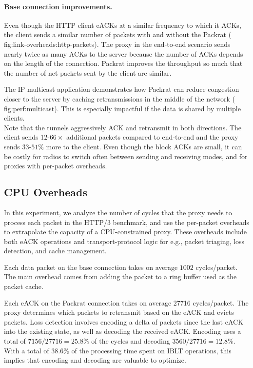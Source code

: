 \paragraph{Base connection improvements.}

Even though the HTTP client eACKs at a similar frequency to which it ACKs, the
client sends a similar number of packets with and without the Packrat (\Cref
{fig:link-overheads:http-packets}). The proxy in the end-to-end scenario sends
nearly twice as many ACKs to the server because the number of ACKs depends on
the length of the connection. Packrat improves the throughput so much that the
number of net packets sent by the client are similar.

The IP multicast application demonstrates how Packrat can reduce congestion closer
to the server by caching retransmissions in the middle of the network (\Cref
{fig:perf:multicast}). This is especially impactful if the data is shared by
multiple clients.\\

\noindent Note that the tunnels aggressively ACK and retransmit in both
directions. The client sends $12$-$66\!\times$ additional packets compared to
end-to-end and the proxy sends $33$-$51$\% more to the client. Even though the
block ACKs are small, it can be costly for radios to switch often between
sending and receiving modes, and for proxies with per-packet overheads.

\subsection{CPU Overheads}

In this experiment, we analyze the number of cycles that the proxy
needs to process each
packet in the HTTP/3 benchmark, and use the per-packet overheads to
extrapolate the capacity of a CPU-constrained proxy. These overheads
include both eACK operations and transport-protocol logic for e.g.,
packet triaging, loss detection, and cache management.

Each data packet on the base connection takes on average $1002$ cycles/packet.
The main overhead comes from adding the packet to a ring buffer used as the
packet cache.

Each eACK on the Packrat connection takes on average 27716 cycles/packet. The
proxy determines which packets to retransmit based on the eACK and evicts
packets. Loss detection involves encoding a delta of packets since the last
eACK into the existing state, as well as decoding the received eACK. Encoding
uses a total of $7156/27716 = 25.8\%$ of the cycles and decoding $3560/27716 =
12.8\%$. With a total of $38.6\%$ of the processing time spent on IBLT
operations, this implies that encoding and decoding are valuable to optimize.

